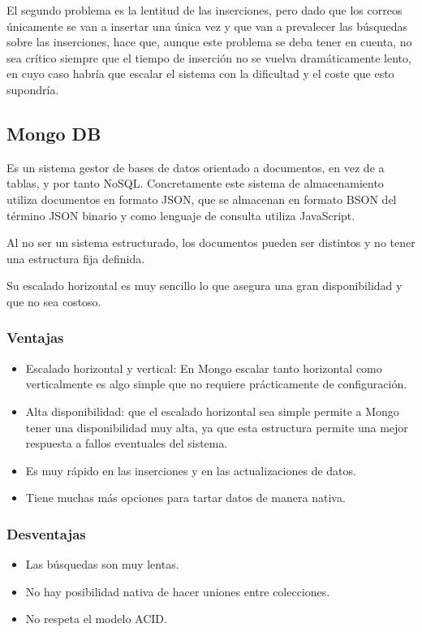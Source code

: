El segundo problema es la lentitud de las inserciones, pero dado que los correos únicamente se van a insertar una única vez y que van a prevalecer las búsquedas sobre las inserciones, hace que, aunque este problema se deba tener en cuenta, no sea crítico siempre que el tiempo de inserción no se vuelva dramáticamente lento, en cuyo caso habría que escalar el sistema con la dificultad y el coste que esto supondría.

\subsection{Mongo DB}
Es un sistema gestor de bases de datos orientado a documentos, en vez de a tablas, y por tanto NoSQL. Concretamente este sistema de almacenamiento utiliza documentos en formato JSON, que se almacenan en formato BSON del término JSON binario y como lenguaje de consulta utiliza JavaScript.

Al no ser un sistema estructurado, los documentos pueden ser distintos y no tener una estructura fija definida. 

Su escalado horizontal es muy sencillo lo que asegura una gran disponibilidad y que no sea costoso. 
\subsubsection{Ventajas}
\begin{itemize}
    \item Escalado horizontal y vertical: En Mongo escalar tanto horizontal como verticalmente es algo simple que no requiere prácticamente de configuración. 
    \item Alta disponibilidad: que el escalado horizontal sea simple permite a Mongo tener una disponibilidad muy alta, ya que esta estructura permite una mejor respuesta a fallos eventuales del sistema. 
    \item Es muy rápido en las inserciones y en las actualizaciones de datos. 
    \item Tiene muchas más opciones para tartar datos de manera nativa. 
\end{itemize}

\subsubsection{Desventajas}
\begin{itemize}
    \item Las búsquedas son muy lentas.
    \item No hay posibilidad nativa de hacer uniones entre colecciones. 
    \item No respeta el modelo ACID.
\end{itemize}

